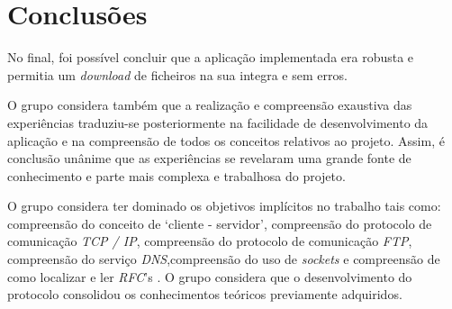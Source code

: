 \documentclass[a4paper, 11pt]{article}
\begin{document}
\section{Conclusões}

No final, foi possível concluir que a aplicação implementada era robusta e permitia um \textit{download} de ficheiros na sua integra e sem erros.

O grupo considera também que a realização e compreensão exaustiva das experiências traduziu-se posteriormente na facilidade de desenvolvimento da aplicação e na compreensão de todos os conceitos relativos ao projeto. Assim, é conclusão unânime que as experiências se revelaram uma grande fonte de conhecimento e parte mais complexa e trabalhosa do projeto.

O grupo considera ter dominado os objetivos implícitos no trabalho tais como: compreensão do conceito de `cliente - servidor', compreensão do protocolo de comunicação \textit{TCP / IP}, compreensão do protocolo de comunicação \textit{FTP}, compreensão do serviço \textit{DNS},compreensão do uso de \textit{sockets} e compreensão de como localizar e ler \textit{RFC}'s . O grupo considera que o desenvolvimento do protocolo consolidou os conhecimentos teóricos previamente adquiridos. 

\clearpage

\end{document}
